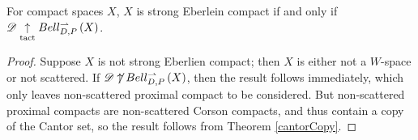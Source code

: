 \documentclass[11pt]{article}
\begin{document}
  \begin{corollary}
    For compact spaces $X$,
    $X$ is strong Eberlein compact if and only if
    $\mathscr{D}\underset{\text{tact}}{\uparrow}Bell_{D,P}^{\rightharpoonup}\left({X}\right)$.
  \end{corollary}

  \begin{proof}
    Suppose $X$ is not strong Eberlien compact; then $X$ is either
    not a $W$-space or not scattered.
    If $\mathscr{D}\not\uparrow Bell_{D,P}^{\rightharpoonup}\left({X}\right)$, then the result follows immediately,
    which only leaves non-scattered proximal compact to be considered.
    But non-scattered proximal compacts are non-scattered Corson compacts,
    and thus contain
    a copy of the Cantor set, so the result follows from Theorem
    \ref{cantorCopy}.
  \end{proof}
\end{document}
